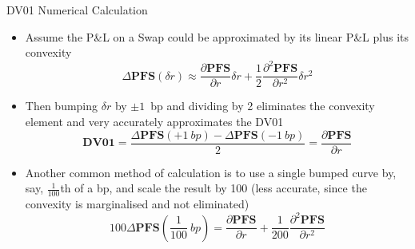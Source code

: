 \documentclass{beamer}
\begin{document}

\begin{frame}{DV01 Numerical Calculation}
\begin{itemize}
	\item<1-> Assume the P\&L on a Swap could be approximated by its linear P\&L plus its convexity
	\begin{equation*}
	\Delta \textbf{PFS}(\delta r)\approx \frac{\partial \textbf{PFS} }{\partial r}\delta r + \frac{1}{2}\frac{\partial^2 \textbf{PFS}}{\partial r^2}\delta r^2
	\end{equation*}
	\item<2-> Then bumping $\delta r$ by $\pm 1$~bp and dividing by 2 eliminates the convexity element and very accurately approximates the DV01
	\begin{equation*}
	\textbf{DV01} = \frac{\Delta \textbf{PFS}(+1~bp)-\Delta \textbf{PFS}(-1~bp)}{2}=\frac{\partial \textbf{PFS} }{\partial r}
	\end{equation*}
	\item<3-> Another common method of calculation is to use a single bumped curve by, say, $\frac{1}{100}$th of a bp, and scale the result by 100 (less accurate, since the convexity is marginalised and not eliminated)
	\begin{equation*}
	100\Delta \textbf{PFS}\left(\frac{1}{100}~bp\right)=\frac{\partial \textbf{PFS}}{\partial r}+\frac{1}{200}\frac{\partial^2\textbf{PFS}}{\partial r^2}
	\end{equation*}
	\end{itemize}
\end{frame}
\end{document}
